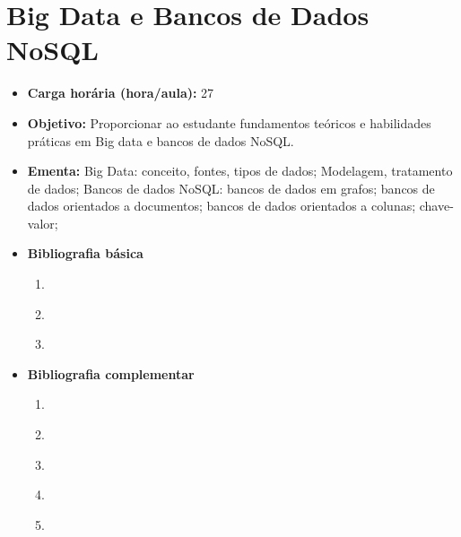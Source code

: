 \documentclass[11pt,fleqn]{book} %
\begin{document}
\section{Big Data e Bancos de Dados NoSQL}\label{3_nosql}
\begin{itemize}
	\item \textbf{Carga horária (hora/aula):} 27
	\item \textbf{Objetivo:} Proporcionar ao estudante fundamentos teóricos e habilidades práticas em Big data e bancos de dados NoSQL.
	\item \textbf{Ementa:} 
	Big Data: conceito, fontes, tipos de dados;
	Modelagem, tratamento de dados;	
	Bancos de dados NoSQL: bancos de dados em grafos; bancos de dados orientados a documentos; bancos de dados orientados a colunas; chave-valor;
	\item \textbf{Bibliografia básica}
	\begin{enumerate}
		\item~\cite{silberschatz2016}
		\item \cite{elmasri_navathe_2011}
		\item~\cite{date2004}
	\end{enumerate}
	\item \textbf{Bibliografia complementar}
	\begin{enumerate}
		\item~\cite{milani2008}
		\item \cite{machado_2014}
		\item \cite{angelotti_2010}
		\item \cite{cougo_1997}
		\item \cite{toby_2007}
	\end{enumerate}		
\end{itemize}

\newpage
\end{document}

